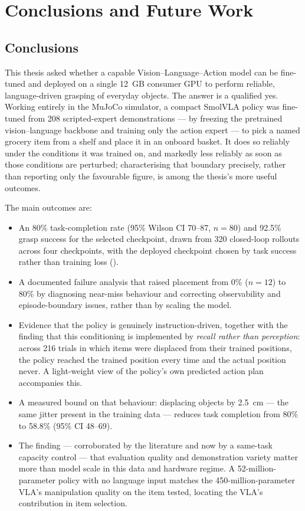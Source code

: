 \chapter{Conclusions and Future Work}
\label{chap:conclusions}

\section{Conclusions}
\label{sec:conclusions}
This thesis asked whether a capable Vision--Language--Action model can be fine-tuned
and deployed on a single 12~GB consumer GPU to perform reliable, language-driven
grasping of everyday objects. The answer is a qualified yes. Working entirely in the
MuJoCo simulator, a compact SmolVLA policy was fine-tuned from 208 scripted-expert
demonstrations --- by freezing the pretrained vision--language backbone and training
only the action expert --- to pick a named grocery item from a shelf and place it in
an onboard basket. It does so reliably under the conditions it was trained on, and
markedly less reliably as soon as those conditions are perturbed; characterising that
boundary precisely, rather than reporting only the favourable figure, is among the
thesis's more useful outcomes.

The main outcomes are:
\begin{itemize}
    \item An 80\% task-completion rate (95\% Wilson CI 70--87, $n=80$) and 92.5\%
    grasp success for the selected checkpoint, drawn from 320 closed-loop rollouts
    across four checkpoints, with the deployed checkpoint chosen by task success
    rather than training loss ().
    \item A documented failure analysis that raised placement from 0\% ($n=12$) to 80\% by
    diagnosing near-miss behaviour and correcting observability and
    episode-boundary issues, rather than by scaling the model.
    \item Evidence that the policy is genuinely instruction-driven, together with the
    finding that this conditioning is implemented by \emph{recall rather than
    perception}: across 216 trials in which items were displaced from their trained
    positions, the policy reached the trained position every time and the actual
    position never. A light-weight view of the policy's own predicted action plan
    accompanies this.
    \item A measured bound on that behaviour: displacing objects by \SI{2.5}{cm} --- the
    same jitter present in the training data --- reduces task completion from 80\% to
    58.8\% (95\% CI 48--69).
    \item The finding --- corroborated by the literature and now by a same-task capacity
    control --- that evaluation quality and demonstration variety matter more than model
    scale in this data and hardware regime. A 52-million-parameter policy with no
    language input matches the 450-million-parameter VLA's manipulation quality on the
    item tested, locating the VLA's contribution in item selection.
\end{itemize}

